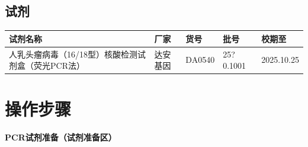 \documentclass[UTF8,10pt,a4paper,fontset=fandol]{ctexart}
\newcommand{\fieldvalue}[1]{#1}
\newcommand{\handwritten}[1]{#1}
\begin{document}
\subsection{试剂}

\begin{tabular}{|p{5.0cm}|p{3.3cm}|p{2.5cm}|p{2.8cm}|}
\hline
试剂名称 & 厂家 & 货号 & 批号 & 校期至 \\
\hline
人乳头瘤病毒（16/18型）核酸检测试剂盒（荧光PCR法）
& 达安基因 & DA0540 &
\fieldvalue{\handwritten{25?0.1001}} &
\fieldvalue{\handwritten{2025.10.25}}
\\
\hline
\end{tabular}

\section{操作步骤}

\begin{center}
\textbf{PCR试剂准备（试剂准备区）}
\end{center}
\end{document}
